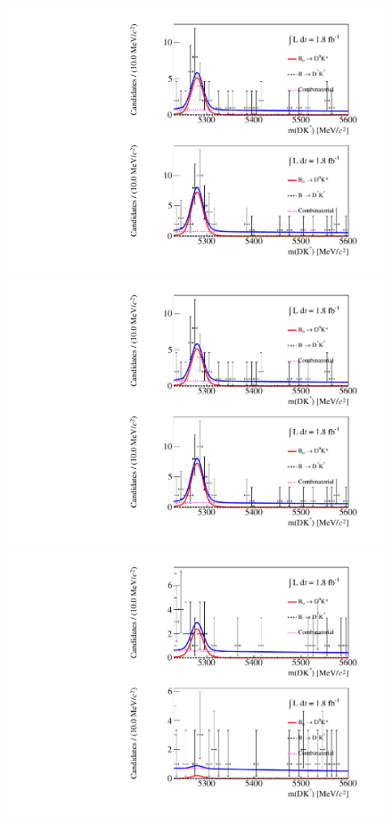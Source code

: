 \begin{figure}
\includegraphics[trim = 0 0.5\imageheight{} 0 0,clip,width=0.5\linewidth]{figures/results/canvas_d2pipi_DD_run2.pdf}
\includegraphics[trim = 0 0 0 0.5\imageheight{},clip,width=0.5\linewidth]{figures/results/canvas_d2pipi_DD_run2.pdf}
\hfill
{}
\includegraphics[trim = 0 0.5\imageheight{} 0 0,clip,width=0.5\linewidth]{figures/results/canvas_d2pik_DD_run2.pdf}

\end{figure}
